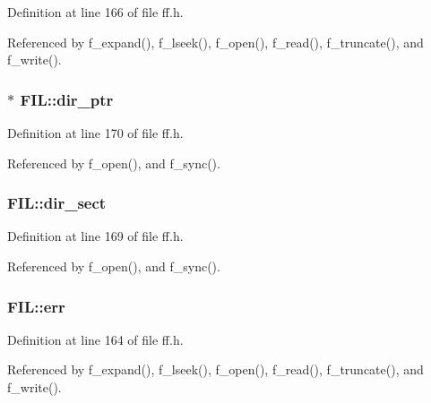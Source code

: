 Definition at line 166 of file ff.\+h.



Referenced by f\+\_\+expand(), f\+\_\+lseek(), f\+\_\+open(), f\+\_\+read(), f\+\_\+truncate(), and f\+\_\+write().

\subsubsection[{\texorpdfstring{dir\+\_\+ptr}{dir_ptr}}]{$\ast$ F\+I\+L\+::dir\+\_\+ptr}\hypertarget{structFIL_a5af9e9fb312b629220eaf684dd28c4a9}{}\label{structFIL_a5af9e9fb312b629220eaf684dd28c4a9}


Definition at line 170 of file ff.\+h.



Referenced by f\+\_\+open(), and f\+\_\+sync().

\subsubsection[{\texorpdfstring{dir\+\_\+sect}{dir_sect}}]{ F\+I\+L\+::dir\+\_\+sect}\hypertarget{structFIL_ab203794f939ad4480e81dfa488770783}{}\label{structFIL_ab203794f939ad4480e81dfa488770783}


Definition at line 169 of file ff.\+h.



Referenced by f\+\_\+open(), and f\+\_\+sync().

\subsubsection[{\texorpdfstring{err}{err}}]{ F\+I\+L\+::err}\hypertarget{structFIL_aea440945db26de9c4a88065c0c887fda}{}\label{structFIL_aea440945db26de9c4a88065c0c887fda}


Definition at line 164 of file ff.\+h.



Referenced by f\+\_\+expand(), f\+\_\+lseek(), f\+\_\+open(), f\+\_\+read(), f\+\_\+truncate(), and f\+\_\+write().


